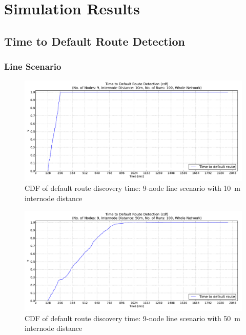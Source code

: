 \chapter{Simulation Results}

\section{Time to Default Route Detection}
\label{Appx:cdf}
\subsection{Line Scenario}
\label{Appx:cdf:line}
\begin{figure}[htpb]
  \begin{center}
    \leavevmode
      \includegraphics[scale=0.38]
      {Pics/results/9/MRHOF/line/dist10_montecarlo_cdf_hist.pdf}
   \caption{CDF of default route discovery time: 9-node line scenario with 10~m internode distance}
   \label{fig:9_MRHOF_line_10_cdf}
  \end{center}
\end{figure}

\begin{figure}[htpb]
  \begin{center}
    \leavevmode
        \includegraphics[scale=0.38]
      {Pics/results/9/MRHOF/line/dist50_montecarlo_cdf_hist.pdf}
   \caption{CDF of default route discovery time: 9-node line scenario with 50~m internode distance}
   \label{fig:9_MRHOF_line_50_cdf}
  \end{center}
\end{figure}

